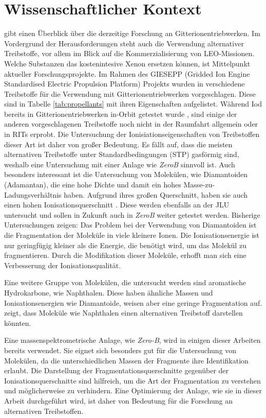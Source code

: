 \chapter{Wissenschaftlicher Kontext}
\cite{ion} gibt einen Überblick über die derzeitige Forschung an Gitterionentriebwerken. Im Vordergrund der Herausforderungen steht auch die Verwendung alternativer Treibstoffe, vor allem im Blick auf die Kommerzialisierung von LEO-Missionen. Welche Substanzen das kostenintesive Xenon ersetzen können, ist Mittelpunkt aktueller Forschungsprojekte. Im Rahmen des GIESEPP (Gridded Ion Engine Standardised Electric Propulsion Platform) Projekts wurden in \cite{Prop} verschiedene Treibstoffe für die Verwendung mit Gitterionentriebwerken vorgeschlagen. Diese sind in Tabelle \ref{tab:propellants} mit ihren Eigenschaften aufgelistet. Während Iod bereits in Gitterionentriebwerken in-Orbit getestet wurde \cite{Iodine}, sind einige der anderen vorgeschlagenen Treibstoffe noch nicht in der Raumfahrt allgemein oder in RITs erprobt. Die Untersuchung der Ionisiationseigenschaften von Treibstoffen dieser Art ist daher von großer Bedeutung. Es fällt auf, dass die meisten alternativen Treibstoffe unter Standardbedingungen (STP) gasförmig sind, weshalb eine Untersuchung mit einer Anlage wie \textit{ZeroB} sinnvoll ist. Auch besonders interessant ist die Untersuchung von Molekülen, wie Diamantoiden (Adamantan), die eine hohe Dichte und damit ein hohes Masse-zu-Ladungsverhältnis haben. Aufgrund ihres großen Querschnitt, haben sie auch einen hohen Ionisationsquerschnitt \cite{ion}. Diese werden ebenfalls an der JLU untersucht \cite{diamondoids} und sollen in Zukunft auch in \textit{ZeroB} weiter getestet werden. Bisherige Untersuchungen zeigen: Das Problem bei der Verwendung von Diamantoiden ist die Fragmentation der Moleküle in viele kleinere Ionen. Die Ionisationsenergie ist nur geringfügig kleiner als die Energie, die benötigt wird, um das Molekül zu fragmentieren. Durch die Modifikation dieser Moleküle, erhofft man sich eine Verbesserung der Ionisationsqualität. 

Eine weitere Gruppe von Molekülen, die untersucht werden sind aromatische Hydrokarbone, wie Naphthalen. Diese haben ähnliche Massen und Ionisationsenergien wie Diamantoide, weisen aber eine geringe Fragmentation auf. \cite{hydrocarbons} zeigt, dass Moleküle wie Naphthalen einen alternativen Treibstoff darstellen könnten.

Eine massenspektrometrische Anlage, wie \textit{Zero-B}, wird in einigen dieser Arbeiten bereits verwendet. Sie eignet sich besonders gut für die Untersuchung von Molekülen, da die unterschiedlichen Massen der Fragmente ihre Identifikation erlaubt. Die Darstellung der Fragmentationsquerschnitte gegenüber der Ionisationsquerschnitte sind hilfreich, um die Art der Fragmentation zu verstehen und möglicherweise zu verhindern. Eine Optimierung der Anlage, wie sie in dieser Arbeit durchgeführt wird, ist daher von  Bedeutung für die Forschung an alternativen Treibstoffen.


